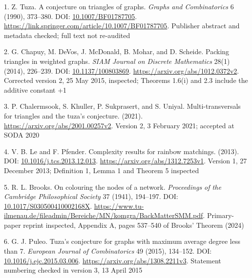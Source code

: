 \documentclass[11pt]{article}
\newenvironment{CSLReferences}[2]{\par\setlength{\parindent}{0pt}\setlength{\parskip}{6pt}}{}
\begin{document}
\protect{}\label{refs}
\begin{CSLReferences}{0}{1}
\par{}\label{ref-Tuza1990}
1. Z. Tuza. A conjecture on triangles of graphs. \emph{Graphs and Combinatorics} 6 (1990), 373--380. DOI: \href{https://doi.org/10.1007/BF01787705}{10.1007/BF01787705}. \url{https://link.springer.com/article/10.1007/BF01787705}. Publisher abstract and metadata checked; full text not re-audited

\par{}\label{ref-ChapuyEtAl2014}
2. G. Chapuy, M. DeVos, J. McDonald, B. Mohar, and D. Scheide. Packing triangles in weighted graphs. \emph{SIAM Journal on Discrete Mathematics} 28(1) (2014), 226--239. DOI: \href{https://doi.org/10.1137/100803869}{10.1137/100803869}. \url{https://arxiv.org/abs/1012.0372v2}. Corrected version 2, 25 May 2015, inspected; Theorems 1.6(i) and 2.3 include the additive constant +1

\par{}\label{ref-CKSU2021}
3. P. Chalermsook, S. Khuller, P. Sukprasert, and S. Uniyal. Multi-transversals for triangles and the tuza's conjecture. (2021). \url{https://arxiv.org/abs/2001.00257v2}. Version 2, 3 February 2021; accepted at SODA 2020

\par{}\label{ref-LePfender2013}
4. V. B. Le and F. Pfender. Complexity results for rainbow matchings. (2013). DOI: \href{https://doi.org/10.1016/j.tcs.2013.12.013}{10.1016/j.tcs.2013.12.013}. \url{https://arxiv.org/abs/1312.7253v1}. Version 1, 27 December 2013; Definition 1, Lemma 1 and Theorem 5 inspected

\par{}\label{ref-Brooks1941}
5. R. L. Brooks. On colouring the nodes of a network. \emph{Proceedings of the Cambridge Philosophical Society} 37 (1941), 194--197. DOI: \href{https://doi.org/10.1017/S030500410002168X}{10.1017/S030500410002168X}. \url{https://www.tu-ilmenau.de/fileadmin/Bereiche/MN/komgra/BackMatterSMM.pdf}. Primary-paper reprint inspected, Appendix A, pages 537--540 of Brooks' Theorem (2024)

\par{}\label{ref-Puleo2015}
6. G. J. Puleo. Tuza's conjecture for graphs with maximum average degree less than 7. \emph{European Journal of Combinatorics} 49 (2015), 134--152. DOI: \href{https://doi.org/10.1016/j.ejc.2015.03.006}{10.1016/j.ejc.2015.03.006}. \url{https://arxiv.org/abs/1308.2211v3}. Statement numbering checked in version 3, 13 April 2015


\end{CSLReferences}
\end{document}

